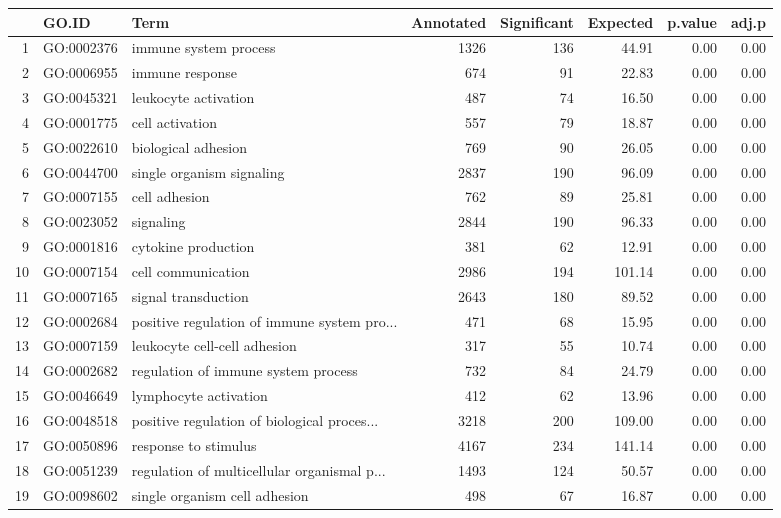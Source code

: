 \begin{table}[ht]
\centering
\begin{tabular}{rllrrrrr}
  \hline
 & GO.ID & Term & Annotated & Significant & Expected & p.value & adj.p \\ 
  \hline
1 & GO:0002376 & immune system process & 1326 & 136 & 44.91 & 0.00 & 0.00 \\ 
  2 & GO:0006955 & immune response & 674 &  91 & 22.83 & 0.00 & 0.00 \\ 
  3 & GO:0045321 & leukocyte activation & 487 &  74 & 16.50 & 0.00 & 0.00 \\ 
  4 & GO:0001775 & cell activation & 557 &  79 & 18.87 & 0.00 & 0.00 \\ 
  5 & GO:0022610 & biological adhesion & 769 &  90 & 26.05 & 0.00 & 0.00 \\ 
  6 & GO:0044700 & single organism signaling & 2837 & 190 & 96.09 & 0.00 & 0.00 \\ 
  7 & GO:0007155 & cell adhesion & 762 &  89 & 25.81 & 0.00 & 0.00 \\ 
  8 & GO:0023052 & signaling & 2844 & 190 & 96.33 & 0.00 & 0.00 \\ 
  9 & GO:0001816 & cytokine production & 381 &  62 & 12.91 & 0.00 & 0.00 \\ 
  10 & GO:0007154 & cell communication & 2986 & 194 & 101.14 & 0.00 & 0.00 \\ 
  11 & GO:0007165 & signal transduction & 2643 & 180 & 89.52 & 0.00 & 0.00 \\ 
  12 & GO:0002684 & positive regulation of immune system pro... & 471 &  68 & 15.95 & 0.00 & 0.00 \\ 
  13 & GO:0007159 & leukocyte cell-cell adhesion & 317 &  55 & 10.74 & 0.00 & 0.00 \\ 
  14 & GO:0002682 & regulation of immune system process & 732 &  84 & 24.79 & 0.00 & 0.00 \\ 
  15 & GO:0046649 & lymphocyte activation & 412 &  62 & 13.96 & 0.00 & 0.00 \\ 
  16 & GO:0048518 & positive regulation of biological proces... & 3218 & 200 & 109.00 & 0.00 & 0.00 \\ 
  17 & GO:0050896 & response to stimulus & 4167 & 234 & 141.14 & 0.00 & 0.00 \\ 
  18 & GO:0051239 & regulation of multicellular organismal p... & 1493 & 124 & 50.57 & 0.00 & 0.00 \\ 
  19 & GO:0098602 & single organism cell adhesion & 498 &  67 & 16.87 & 0.00 & 0.00 \\ 

\end{tabular}
\end{table}
